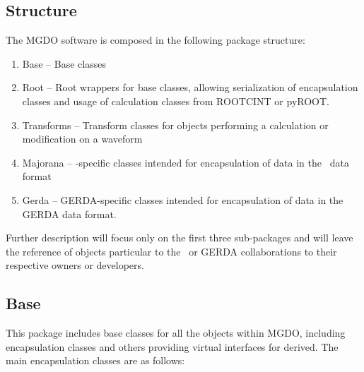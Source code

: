 		\subsection{Structure}
		
		The MGDO software is composed in the following package structure:

			\begin{enumerate}
				\item Base -- Base classes
				\item Root -- Root wrappers for base classes, allowing serialization of encapsulation classes and usage of calculation classes from ROOTCINT or pyROOT.
				\item Transforms -- Transform classes for objects performing a calculation or modification on a waveform
				\item Majorana -- \MJ-specific classes intended for encapsulation of data in the \MJ~data format
				\item Gerda -- GERDA-specific classes intended for encapsulation of data in the GERDA data format.
			\end{enumerate}
		Further description will focus only on the first three sub-packages and will leave the reference of objects particular to the \MJ~or GERDA collaborations to their respective owners or developers.
		
		\subsection{Base}
	This package includes base classes for all the objects within MGDO,
including encapsulation classes and others providing virtual interfaces for
derived.  The main encapsulation classes are as follows:

